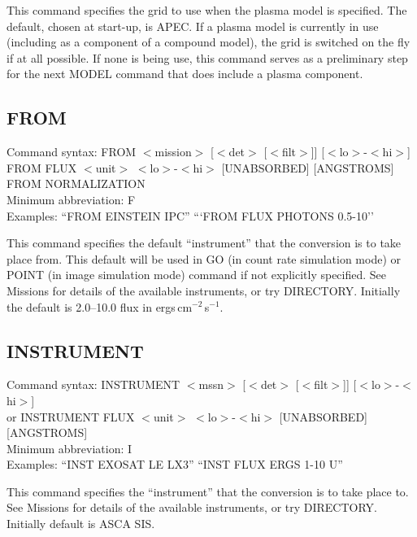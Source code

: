 \documentclass[11pt]{article}
\begin{document}
\begin{appendices}
This command specifies the grid to use when the plasma model is specified.
The default, chosen at start-up, is APEC.  If a plasma model is currently
in use (including as a component of a compound model), the grid is switched
on the fly if at all possible.  If none is being use, this command serves
as a preliminary step for the next MODEL command that does include a plasma
component.

\subsection{FROM}

Command syntax: FROM $<$mission$>$ [$<$det$>$ [$<$filt$>$]] [$<$lo$>$-$<$hi$>$] \\
\hspace{1.5 cm} FROM FLUX $<$unit$>$ $<$lo$>$-$<$hi$>$ [UNABSORBED] [ANGSTROMS] \\
\hspace{1.5 cm} FROM NORMALIZATION \\
Minimum abbreviation: F \\
Examples: ``FROM EINSTEIN IPC'' ```FROM FLUX PHOTONS 0.5-10'' \\
\vspace{0.5 cm}

This command specifies the default ``instrument'' that the conversion is to take
place from.   This default will be used in  GO (in count rate simulation mode)
or POINT (in image simulation mode) command if not explicitly specified.   See
Missions for details of the available instruments, or try DIRECTORY. Initially
the default is 2.0--10.0 flux in ergs\,cm$^{-2}$\,s$^{-1}$.

\subsection{INSTRUMENT}

Command syntax: INSTRUMENT $<$mssn$>$ [$<$det$>$ [$<$filt$>$]] [$<$lo$>$-$<$hi$>$] \\
\hspace{1.5 cm} or INSTRUMENT FLUX $<$unit$>$ $<$lo$>$-$<$hi$>$ [UNABSORBED] [ANGSTROMS] \\
Minimum abbreviation: I \\
Examples: ``INST EXOSAT LE LX3'' ``INST FLUX ERGS 1-10 U'' \\
\vspace{0.5 cm}

This command specifies the  ``instrument''  that the conversion is to take place
to.   See Missions for details of the available instruments, or try DIRECTORY.
Initially default is ASCA SIS.


\end{appendices}
\end{document}
